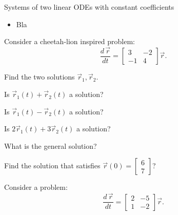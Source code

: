\standardonlynewpage

%
%



\begin{module}{Systems of two linear ODEs with constant coefficients}
	\label{sys:solve}

	
	
\end{module}



\begin{lesson}

	\begin{itemize}
		\item Bla
	\end{itemize}
	

\end{lesson}




\question
Consider a cheetah-lion inspired problem:
$$
\frac{d \,\vec{r}}{dt} = \begin{bmatrix} 3 & -2 \\ -1 & 4\end{bmatrix} \vec{r}.
$$
	
\begin{parts}
	\item Find the two solutions $\vec{r}_1, \vec{r}_2$.
	\item Is $\vec{r}_1(t) + \vec{r}_2(t)$ a solution?
	\item Is $\vec{r}_1(t) - \vec{r}_2(t)$ a solution?
	\item Is $2\vec{r}_1(t) + 3\vec{r}_2(t)$ a solution?
	\item What is the general solution?
	\item Find the solution that satisfies $\vec{r}(0) = \begin{bmatrix} 6 \\ 7\end{bmatrix}$?
\end{parts}


\bookonlynewpage


\question
Consider a problem:
$$
\frac{d \,\vec{r}}{dt} = \begin{bmatrix} 2 & -5 \\ 1 & -2\end{bmatrix} \vec{r}.
$$
	
